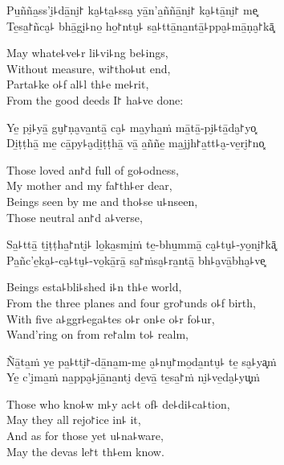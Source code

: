 
\begin{leader}
\end{leader}

Pu̱ñña̱ss'i̮꜕dā̱ni̮꜓ ka̮꜕ta̱꜕ssa̮ yā̱n'a̱ññā̱ni̮꜓ ka̮꜕tā̱ni̮꜓ me͓\\
Te̱sa̱꜓ñca̮꜕ bhā̱gi̮꜕no̱ ho̱꜓ntu̮꜕ sa̱꜕ttā̱na̱ntā̱꜕ppa̮꜕mā̱ṇa̮꜓kā͓

\begin{english}
  May whate꜕ve꜕r li꜕vi꜕ng be꜕ings,\\
  Without measure, wi꜓tho꜕ut end,\\
  Parta꜕ke o꜕f al꜕l th꜕e me꜕rit,\\
  From the good deeds I꜓ ha꜕ve done:
\end{english}

Ye̱ pi̮꜕yā̱ gu̮꜓ṇa̮va̱ntā̱ ca̮꜕ ma̱yha̱ṁ mā̱tā̱-pi̮꜕tā̱da̮꜓yo͓\\
Di̱ṭṭhā̱ me̱ cā̱py꜕a̮di̱ṭṭhā̱ vā̱ a̱ññe̱ ma̱jjh꜓a̱tt꜕a̮-ve̱ri̮꜓no͓

\begin{english}
  Those loved an꜓d full of go꜕odness,\\
  My mother and my fa꜓th꜕er dear,\\
  Beings seen by me and tho꜕se u꜕nseen,\\
  Those neutral an꜓d a꜕verse,
\end{english}

Sa̱꜕ttā̱ ti̱ṭṭha̱꜓nti̮꜕ lo̱ka̱smi̱ṁ te̱-bhu̱mmā̱ ca̮꜕tu̮꜕-yo̱ni̮꜓kā͓\\
Pa̱ñc'e̱ka̮꜕-ca̮꜕tu̮꜕-vo̱kā̱rā̱ sa̱꜓ṁsa̮꜕ra̱ntā̱ bh꜕a̮vā̱bha̮꜕ve͓

\begin{english}
  Beings esta꜕bli꜕shed i꜕n th꜕e world,\\
  From the three planes and four gro꜓unds o꜕f birth,\\
  With five a꜕ggr꜕ega꜕tes o꜕r on꜕e o꜕r fo꜕ur,\\
  Wand'ring on from re꜓alm to꜕ realm,
\end{english}

Ñā̱ta̱ṁ ye̱ pa̱꜕tti̮꜓-dā̱na̱m-me̱ a̮꜕nu̮꜓mo̱da̱ntu̮꜕ te̱ sa̮꜕ya͓ṁ\\
Ye̱ c'i̮ma̱ṁ na̱ppa̮꜕jā̱na̱nti̮ de̱vā̱ te̱sa̱꜓ṁ ni̮꜕ve̱da̮꜕yu͓ṁ

\clearpage

\begin{english}
  Those who kno꜕w m꜕y ac꜕t of꜕ de꜕di꜕ca꜕tion,\\
  May they all rejo꜓ice in꜕ it,\\
  And as for those yet u꜕na꜕ware,\\
  May the devas le꜓t th꜕em know.
\end{english}

